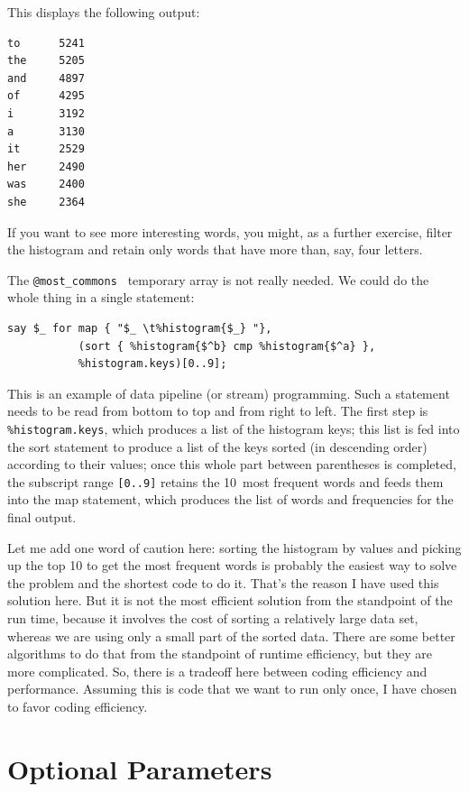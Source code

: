 This displays the following output:

\begin{verbatim}
to      5241
the     5205
and     4897
of      4295
i       3192
a       3130
it      2529
her     2490
was     2400
she     2364
\end{verbatim}
%
If you want to see more interesting words, you might, as a
further exercise, filter the histogram and retain only 
words that have more than, say, four letters.

The \verb'@most_commons ' temporary array is not really needed. 
We could do the whole thing in a single statement:

\begin{verbatim}
say $_ for map { "$_ \t%histogram{$_} "},  
           (sort { %histogram{$^b} cmp %histogram{$^a} }, 
           %histogram.keys)[0..9];
\end{verbatim}

This is an example of data pipeline (or stream) programming. Such a statement 
needs to be read from bottom to top and from right to left. The 
first step is \verb'%histogram.keys', which produces a list 
of the histogram keys; this list is fed into the sort statement 
to produce a list of the keys sorted (in descending order) according 
to their values; once this whole part between parentheses is 
completed, the subscript range \verb'[0..9]' retains the 
10~most frequent words and feeds them into the map statement, 
which produces the list of words and frequencies for the final 
output.

Let me add one word of caution here: sorting the histogram by 
values and picking up the top 10 to get the most frequent 
words is probably the easiest way to solve the problem and the 
shortest code to do it. That's the reason I have used this 
solution here. But it is not the most efficient solution 
from the standpoint of the run time, because it involves the 
cost of sorting a relatively large data set, whereas we are 
using only a small part of the sorted data. There are some 
better algorithms to do that from the standpoint of runtime 
efficiency, but they are more complicated. So, there is a 
tradeoff here between coding efficiency and performance. 
Assuming this is code that we want to run only once, I have 
chosen to favor coding efficiency.



\section{Optional Parameters}

